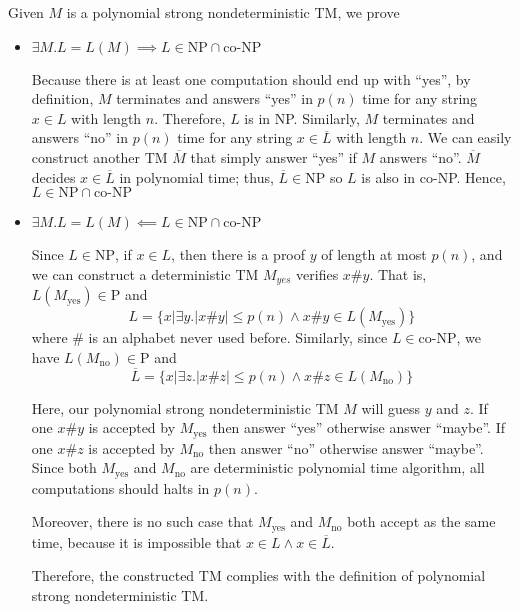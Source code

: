 \documentclass[11pt]{homework}
\begin{document}
Given \(M\) is a polynomial strong nondeterministic TM, we prove
\begin{itemize}
\item \(\exists M. L = L(M) \implies L \in \text{NP} \cap \text{co-NP}\)

Because there is at least one computation should end up with ``yes'',
by definition, \(M\) terminates and answers ``yes'' in \(p(n)\) time
for any string \(x \in L\) with length \(n\).
Therefore, \(L\) is in NP.
Similarly, \(M\) terminates and answers ``no'' in \(p(n)\) time
for any string \(x \in \overline{L}\) with length \(n\).
We can easily construct another TM \(\overline{M}\) that simply answer ``yes'' if \(M\) answers ``no''.
\(\overline{M}\) decides \(x \in \overline{L}\) in polynomial time; thus,
\(\overline{L} \in \text{NP}\) so \(L\) is also in co-NP.
Hence, \(L \in \text{NP} \cap \text{co-NP}\)

\item \(\exists M. L = L(M) \impliedby L \in \text{NP} \cap \text{co-NP}\)

Since \(L \in \text{NP}\), if \(x \in L\),
then there is a proof \(y\) of length at most \(p(n)\),
and we can construct a deterministic TM \(M_{yes}\) verifies \(x\#y\).
That is, \(L(M_\text{yes}) \in \text{P}\) and
\[
  L = \{x|\exists y. |x\#y| \leq p(n) \land x\#y \in L(M_\text{yes}) \}
\] where \(\#\) is an alphabet never used before.
Similarly, since \(L \in \text{co-NP}\),
we have \(L(M_\text{no}) \in \text{P}\) and
\[
  \overline{L} = \{x|\exists z. |x\#z| \leq p(n) \land x\#z \in L(M_\text{no}) \}
\]

Here, our polynomial strong nondeterministic TM \(M\) will guess \(y\) and \(z\).
If one \(x\#y\) is accepted by \(M_\text{yes}\) then answer ``yes'' otherwise answer ``maybe''.
If one \(x\#z\) is accepted by \(M_\text{no}\) then answer ``no'' otherwise answer ``maybe''.
Since both \(M_\text{yes}\) and \(M_\text{no}\) are deterministic polynomial time algorithm,
all computations should halts in \(p(n)\).

Moreover, there is no such case that \(M_\text{yes}\) and \(M_\text{no}\) both accept as the same time,
because it is impossible that \(x \in L \land x \in \overline{L}\).

Therefore, the constructed TM complies with the definition of polynomial strong nondeterministic TM.

\end{itemize}
\end{document}
